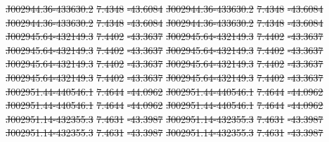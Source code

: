 \documentclass[11pt, a4paper]{book}
\providecommand{\DIFdeltex}[1]{{\protect\color{red}\sout{#1}}}                      %
\providecommand{\DIFdel}[1]{\texorpdfstring{\DIFdeltex{#1}}{}} %
\begin{document}
\DIFdel{J002944.36-433630.2 }%
\DIFdel{7.4348 }%
\DIFdel{-43.6084 }%
\DIFdel{J002944.36-433630.2 }%
\DIFdel{7.4348 }%
\DIFdel{-43.6084 }%
\DIFdel{J002944.36-433630.2 }%
\DIFdel{7.4348 }%
\DIFdel{-43.6084 }%
\DIFdel{J002944.36-433630.2 }%
\DIFdel{7.4348 }%
\DIFdel{-43.6084}%
\DIFdel{J002945.64-432149.3 }%
\DIFdel{7.4402 }%
\DIFdel{-43.3637 }%
\DIFdel{J002945.64-432149.3 }%
\DIFdel{7.4402 }%
\DIFdel{-43.3637 }%
\DIFdel{J002945.64-432149.3 }%
\DIFdel{7.4402 }%
\DIFdel{-43.3637 }%
\DIFdel{J002945.64-432149.3 }%
\DIFdel{7.4402 }%
\DIFdel{-43.3637}%
\DIFdel{J002945.64-432149.3 }%
\DIFdel{7.4402 }%
\DIFdel{-43.3637 }%
\DIFdel{J002945.64-432149.3 }%
\DIFdel{7.4402 }%
\DIFdel{-43.3637 }%
\DIFdel{J002945.64-432149.3 }%
\DIFdel{7.4402 }%
\DIFdel{-43.3637 }%
\DIFdel{J002945.64-432149.3 }%
\DIFdel{7.4402 }%
\DIFdel{-43.3637}%
\DIFdel{J002951.44-440546.1 }%
\DIFdel{7.4644 }%
\DIFdel{-44.0962 }%
\DIFdel{J002951.44-440546.1 }%
\DIFdel{7.4644 }%
\DIFdel{-44.0962 }%
\DIFdel{J002951.44-440546.1 }%
\DIFdel{7.4644 }%
\DIFdel{-44.0962 }%
\DIFdel{J002951.44-440546.1 }%
\DIFdel{7.4644 }%
\DIFdel{-44.0962}%
\DIFdel{J002951.14-432355.3 }%
\DIFdel{7.4631 }%
\DIFdel{-43.3987 }%
\DIFdel{J002951.14-432355.3 }%
\DIFdel{7.4631 }%
\DIFdel{-43.3987 }%
\DIFdel{J002951.14-432355.3 }%
\DIFdel{7.4631 }%
\DIFdel{-43.3987 }%
\DIFdel{J002951.14-432355.3 }%
\DIFdel{7.4631 }%
\DIFdel{-43.3987}%
\end{document}
